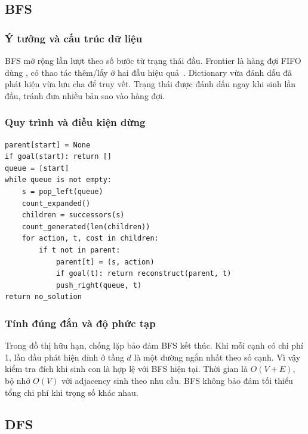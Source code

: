 \documentclass[a4paper]{article}
\newcommand{\tep}[1]{{\small\ttfamily\detokenize{#1}}}
\begin{document}
\subsection{BFS}
\subsubsection{Ý tưởng và cấu trúc dữ liệu}
BFS mở rộng lần lượt theo số bước từ trạng thái đầu. Frontier là hàng đợi FIFO dùng \tep{collections.deque}, có thao tác thêm/lấy ở hai đầu hiệu quả~\cite{deque}. Dictionary \tep{parent} vừa đánh dấu đã phát hiện vừa lưu cha để truy vết. Trạng thái được đánh dấu ngay khi sinh lần đầu, tránh đưa nhiều bản sao vào hàng đợi.

\subsubsection{Quy trình và điều kiện dừng}
\par\noindent\begin{minipage}{\textwidth}
\begin{lstlisting}[caption={Mã giả BFS tương ứng với cách kiểm tra đích sớm hiện tại.}]
parent[start] = None
if goal(start): return []
queue = [start]
while queue is not empty:
    s = pop_left(queue)
    count_expanded()
    children = successors(s)
    count_generated(len(children))
    for action, t, cost in children:
        if t not in parent:
            parent[t] = (s, action)
            if goal(t): return reconstruct(parent, t)
            push_right(queue, t)
return no_solution
\end{lstlisting}
\end{minipage}\par\medskip

\subsubsection{Tính đúng đắn và độ phức tạp}
Trong đồ thị hữu hạn, chống lặp bảo đảm BFS kết thúc. Khi mỗi cạnh có chi phí 1, lần đầu phát hiện đỉnh ở tầng $d$ là một đường ngắn nhất theo số cạnh. Vì vậy kiểm tra đích khi sinh con là hợp lệ với BFS hiện tại. Thời gian là $O(V+E)$, bộ nhớ $O(V)$ với adjacency sinh theo nhu cầu. BFS không bảo đảm tối thiểu tổng chi phí khi trọng số khác nhau.




\subsection{DFS}
\end{document}
